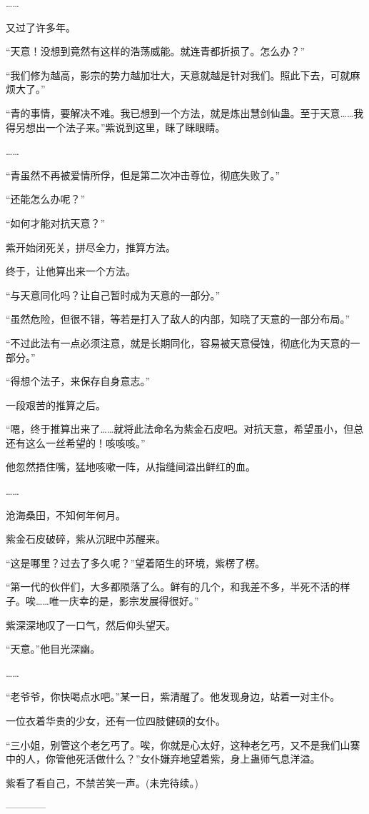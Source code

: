 \begin{this_body}
……

又过了许多年。

“天意！没想到竟然有这样的浩荡威能。就连青都折损了。怎么办？”

“我们修为越高，影宗的势力越加壮大，天意就越是针对我们。照此下去，可就麻烦大了。”

“青的事情，要解决不难。我已想到一个方法，就是炼出慧剑仙蛊。至于天意……我得另想出一个法子来。”紫说到这里，眯了眯眼睛。

……

“青虽然不再被爱情所俘，但是第二次冲击尊位，彻底失败了。”

“还能怎么办呢？”

“如何才能对抗天意？”

紫开始闭死关，拼尽全力，推算方法。

终于，让他算出来一个方法。

“与天意同化吗？让自己暂时成为天意的一部分。”

“虽然危险，但很不错，等若是打入了敌人的内部，知晓了天意的一部分布局。”

“不过此法有一点必须注意，就是长期同化，容易被天意侵蚀，彻底化为天意的一部分。”

“得想个法子，来保存自身意志。”

一段艰苦的推算之后。

“嗯，终于推算出来了……就将此法命名为紫金石皮吧。对抗天意，希望虽小，但总还有这么一丝希望的！咳咳咳。”

他忽然捂住嘴，猛地咳嗽一阵，从指缝间溢出鲜红的血。

……

沧海桑田，不知何年何月。

紫金石皮破碎，紫从沉眠中苏醒来。

“这是哪里？过去了多久呢？”望着陌生的环境，紫楞了楞。

“第一代的伙伴们，大多都陨落了么。鲜有的几个，和我差不多，半死不活的样子。唉……唯一庆幸的是，影宗发展得很好。”

紫深深地叹了一口气，然后仰头望天。

“天意。”他目光深幽。

……

“老爷爷，你快喝点水吧。”某一日，紫清醒了。他发现身边，站着一对主仆。

一位衣着华贵的少女，还有一位四肢健硕的女仆。

“三小姐，别管这个老乞丐了。唉，你就是心太好，这种老乞丐，又不是我们山寨中的人，你管他死活做什么？”女仆嫌弃地望着紫，身上蛊师气息洋溢。

紫看了看自己，不禁苦笑一声。(未完待续。)

------------

\end{this_body}

